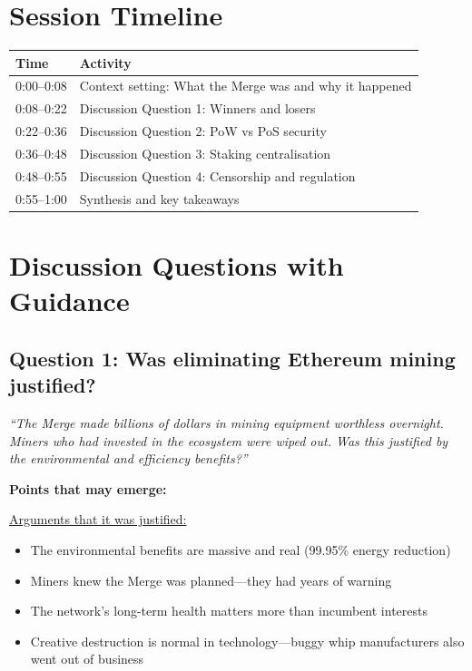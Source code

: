 \documentclass[11pt]{article}
\begin{document}
\section*{Session Timeline}

\begin{center}
\begin{tabular}{ll}
\toprule
\textbf{Time} & \textbf{Activity} \\
\midrule
0:00--0:08 & Context setting: What the Merge was and why it happened \\
0:08--0:22 & Discussion Question 1: Winners and losers \\
0:22--0:36 & Discussion Question 2: PoW vs PoS security \\
0:36--0:48 & Discussion Question 3: Staking centralisation \\
0:48--0:55 & Discussion Question 4: Censorship and regulation \\
0:55--1:00 & Synthesis and key takeaways \\
\bottomrule
\end{tabular}
\end{center}

\section*{Discussion Questions with Guidance}

\subsection*{Question 1: Was eliminating Ethereum mining justified?}

\textit{``The Merge made billions of dollars in mining equipment worthless overnight. Miners who had invested in the ecosystem were wiped out. Was this justified by the environmental and efficiency benefits?''}

\medskip
\noindent\textbf{Points that may emerge:}

\medskip
\noindent\underline{Arguments that it was justified:}
\begin{itemize}[leftmargin=*]
\item The environmental benefits are massive and real (99.95\% energy reduction)
\item Miners knew the Merge was planned---they had years of warning
\item The network's long-term health matters more than incumbent interests
\item Creative destruction is normal in technology---buggy whip manufacturers also went out of business
\end{itemize}
\end{document}
